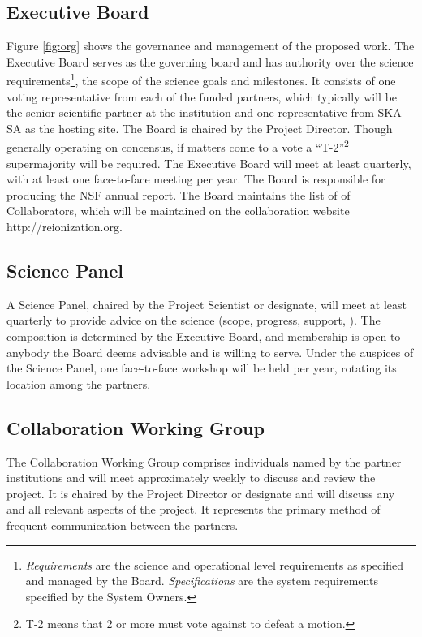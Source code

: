 \documentclass[preprint]{aastex}
\begin{document}
\subsection{Executive Board}
Figure \ref{fig:org} shows the governance and management of the proposed work. The
Executive Board serves as the governing board and has authority over the science
requirements\footnote{{\em Requirements} are the science and operational level
requirements as specified and managed by the Board. {\em Specifications} are the
system requirements specified by the System Owners.}, the scope of the science goals
and milestones. It consists of one voting representative from each of the funded
partners, which typically will be the senior scientific partner at the institution
and one representative from SKA-SA as the hosting site. The Board is chaired by the
Project Director. Though generally operating on concensus, if matters come to a vote
a ``T-2''\footnote{T-2 means that 2 or more must vote against to defeat a motion.}
supermajority will be required. The Executive Board will meet at least quarterly,
with at least one face-to-face meeting per year. The Board is responsible for
producing the NSF annual report. The Board maintains the list of of Collaborators,
which will be maintained on the collaboration website http://reionization.org.

\subsection{Science Panel}
A Science Panel, chaired by the Project Scientist or designate, will meet at least
quarterly to provide advice on the science (scope, progress, support, ). The
composition is determined by the Executive Board, and membership is open to anybody
the Board deems advisable and is willing to serve. Under the auspices of the Science
Panel, one face-to-face workshop will be held per year, rotating its location among
the partners.

\subsection{Collaboration Working Group}
The Collaboration Working Group comprises individuals named by the partner
institutions and will meet approximately weekly to discuss and review the project. It is chaired
by the Project Director or designate and will discuss any and all relevant aspects of
the project. It represents the primary method of frequent communication between the
partners.
\end{document}
